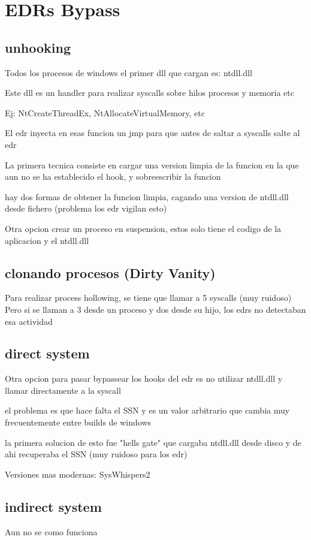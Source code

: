 \chapter{EDRs Bypass}

\section{unhooking}

Todos los procesos de windows el primer dll que cargan es: ntdll.dll 

Este dll es un handler para realizar syscalls sobre hilos procesos y memoria etc

Ej: NtCreateThreadEx, NtAllocateVirtualMemory, etc

El edr inyecta en esas funcion un jmp para que antes de saltar a syscalls salte 
al edr

La primera tecnica consiste en cargar una version limpia de la funcion en la que
aun no se ha establecido el hook, y sobreescribir la funcion

hay dos formas de obtener la funcion limpia, cagando una version de ntdll.dll
desde fichero (problema los edr vigilan esto)

Otra opcion crear un proceso en suspension, estos solo tiene el codigo de la
aplicacion y el ntdll.dll

\section{clonando procesos (Dirty Vanity)}

Para realizar process hollowing, se tiene que llamar a 5 syscalls (muy ruidoso)
Pero si se llaman a 3 desde un proceso y dos desde su hijo, los edrs no
detectaban esa actividad

\section{direct system}

Otra opcion para pasar bypassear los hooks del edr es no utilizar ntdll.dll y 
llamar directamente a la syscall

el problema es que hace falta el SSN y es un valor arbitrario que cambia muy 
frecuentemente entre builds de windows

la primera solucion de esto fue "hells gate" que cargaba ntdll.dll desde disco
y de ahi recuperaba el SSN (muy ruidoso para los edr)

Versiones mas modernas: SysWhispers2

\section{indirect system}

Aun no se como funciona


